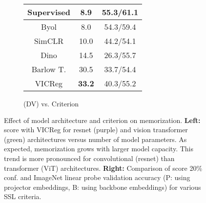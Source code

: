 \begin{figure}[ht]
\begin{minipage}[t]{0.48\textwidth}
\begin{subfigure}[b]{0.52\textwidth}
\begin{tabular}{|c|c|c|}
            \hline
            Supervised & 8.9 & 55.3/61.1\\
            \hline
            Byol\citep{grill2020byol} & 8.0& 54.3/59.4\\
            \hline
            SimCLR\citep{chen2020simclr} & 10.0 & 44.2/54.1\\
            \hline
            Dino\citep{Dino} & 14.5 & 26.3/55.7 \\
            \hline
            Barlow T.\citep{zbontar2021barlow} & 30.5 & 33.7/54.4\\
            \hline
            VICReg\citep{vicreg} & \textbf{33.2} & 40.3/55.2\\
            \hline
          \end{tabular}
          \vspace{1.3em}
          \caption{\dejavu (DV) vs. Criterion}
          \label{tab:dejavu vs. criterion}
    \end{subfigure}
    \vspace{-1.4em}
    \caption{
    Effect of model architecture and criterion on \dejavu memorization. 
    \textbf{Left:} \dejavu score with VICReg for resnet (purple) and vision transformer (green) architectures versus number of model parameters. As expected, memorization grows with larger model capacity. This trend is more pronounced for convolutional (resnet) than transformer (ViT) architectures. \textbf{Right:} Comparison of \dejavu score 20\% conf. and ImageNet linear probe validation accuracy (P: using projector embeddings, B: using backbone embeddings) for various SSL criteria. %
    }
    \end{minipage}
\end{figure}